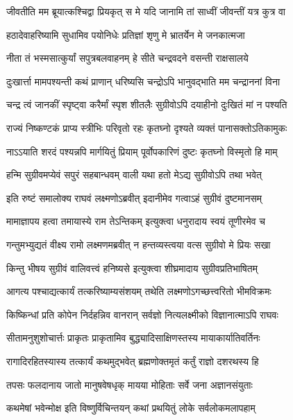 \twolineshloka
{जीवतीति मम ब्रूयात्कश्चिद्वा प्रियकृत् स मे}
{यदि जानामि तां साध्वीं जीवन्तीं यत्र कुत्र वा} %

\twolineshloka
{हठादेवाहरिष्यामि सुधामिव पयोनिधेः}
{प्रतिज्ञां शृणु मे भ्रातर्येन मे जनकात्मजा} %

\twolineshloka
{नीता तं भस्मसात्कुर्यां सपुत्रबलवाहनम्}
{हे सीते चन्द्रवदने वसन्ती राक्षसालये} %

\twolineshloka
{दुःखार्त्ता मामपश्यन्ती कथं प्राणान् धरिष्यसि}
{चन्द्रोऽपि भानुवद्भाति मम चन्द्राननां विना} %

\twolineshloka
{चन्द्र त्वं जानकीं स्पृष्ट्वा करैर्मां स्पृश शीतलैः}
{सुग्रीवोऽपि दयाहीनो दुःखितं मां न पश्यति} %

\twolineshloka
{राज्यं निष्कण्टकं प्राप्य स्त्रीभिः परिवृतो रहः}
{कृतघ्नो दृश्यते व्यक्तं पानासक्तोऽतिकामुकः} %

\twolineshloka
{नाऽऽयाति शरदं पश्यन्नपि मार्गयितुं प्रियाम्}
{पूर्वोपकारिणं दुष्टः कृतघ्नो विस्मृतो हि माम्} %

\twolineshloka
{हन्मि सुग्रीवमप्येवं सपुरं सहबान्धवम्}
{वाली यथा हतो मेऽद्य सुग्रीवोऽपि तथा भवेत्} %

\twolineshloka
{इति रुष्टं समालोक्य राघवं लक्ष्मणोऽब्रवीत्}
{इदानीमेव गत्वाऽहं सुग्रीवं दुष्टमानसम्} %

\twolineshloka
{मामाज्ञापय हत्वा तमायास्ये राम तेऽन्तिकम्}
{इत्युक्त्वा धनुरादाय स्वयं तूणीरमेव च} %

\twolineshloka
{गन्तुमभ्युद्यतं वीक्ष्य रामो लक्ष्मणमब्रवीत्}
{न हन्तव्यस्त्वया वत्स सुग्रीवो मे प्रियः सखा} %

\twolineshloka
{किन्तु भीषय सुग्रीवं वालिवत्त्वं हनिष्यसे}
{इत्युक्त्वा शीघ्रमादाय सुग्रीवप्रतिभाषितम्} %

\twolineshloka
{आगत्य पश्चाद्यत्कार्यं तत्करिष्याम्यसंशयम्}
{तथेति लक्ष्मणोऽगच्छत्त्वरितो भीमविक्रमः} %

\twolineshloka
{किष्किन्धां प्रति कोपेन निर्दहन्निव वानरान्}
{सर्वज्ञो नित्यलक्ष्मीको विज्ञानात्माऽपि राघवः} %

\twolineshloka
{सीतामनुशुशोचार्त्तः प्राकृतः प्राकृतामिव}
{बुद्ध्यादिसाक्षिणस्तस्य मायाकार्यातिवर्तिनः} %

\twolineshloka
{रागादिरहितस्यास्य तत्कार्यं कथमुद्भवेत्}
{ब्रह्मणोक्तमृतं कर्तुं राज्ञो दशरथस्य हि} %

\twolineshloka
{तपसः फलदानाय जातो मानुषवेषधृक्}
{मायया मोहिताः सर्वे जना अज्ञानसंयुताः} %

\twolineshloka
{कथमेषां भवेन्मोक्ष इति विष्णुर्विचिन्तयन्}
{कथां प्रथयितुं लोके सर्वलोकमलापहाम्} %

